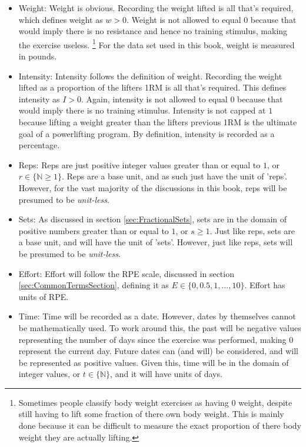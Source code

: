 \begin{itemize}
	\item Weight: Weight is obvious. Recording the weight lifted is all that's required, which defines weight as $w>0$. Weight is not allowed to equal $0$ because that would imply there is no resistance and hence no training stimulus, making the exercise useless. \footnote{Sometimes people classify body weight exercises as having $0$ weight, despite still having to lift some fraction of there own body weight. This is mainly done because it can be difficult to measure the exact proportion of there body weight they are actually lifting.} For the data set used in this book, weight is measured in pounds.
	
	\item Intensity: Intensity follows the definition of weight. Recording the weight lifted as a proportion of the lifters 1RM is all that's required. This defines intensity as $I>0$. Again, intensity is not allowed to equal $0$ because that would imply there is no training stimulus. Intensity is not capped at $1$ because lifting a weight greater than the lifters previous 1RM is the ultimate goal of a powerlifting program. By definition, intensity is recorded as a percentage.
	
	\item Reps: Reps are just positive integer values greater than or equal to $1$, or $r\in \{ \mathbb{N} \ge 1 \}$. Reps are a base unit, and as such just have the unit of 'reps'. However, for the vast majority of the discussions in this book, reps will be presumed to be \textit{unit-less}.
	
	\item Sets: As discussed in section \ref{sec:FractionalSets}, sets are in the domain of positive numbers greater than or equal to $1$, or $s\ge 1$. Just like reps, sets are a base unit, and will have the unit of 'sets'. However, just like reps, sets will be presumed to be \textit{unit-less}.
	
	\item Effort: Effort will follow the RPE scale, discussed in section \ref{sec:CommonTermsSection}, defining it as $E\in \{0,0.5,1,...,10\}$. Effort has units of RPE.
	
	\item Time: Time will be recorded as a date. However, dates by themselves cannot be mathematically used. To work around this, the past will be negative values representing the number of days since the exercise was performed, making $0$ represent the current day. Future dates can (and will) be considered, and will be represented as positive values. Given this, time will be in the domain of integer values, or $t\in \{ \mathbb{N} \}$, and it will have units of days.
	

\end{itemize}
